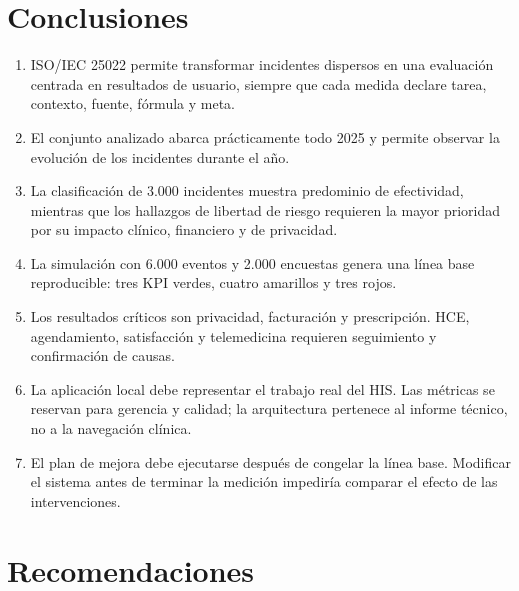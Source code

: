 \section{Conclusiones}

\begin{enumerate}
  \item ISO/IEC 25022 permite transformar incidentes dispersos en una evaluación centrada en resultados de usuario, siempre que cada medida declare tarea, contexto, fuente, fórmula y meta.
  \item El conjunto analizado abarca prácticamente todo 2025 y permite observar la evolución de los incidentes durante el año.
  \item La clasificación de 3.000 incidentes muestra predominio de efectividad, mientras que los hallazgos de libertad de riesgo requieren la mayor prioridad por su impacto clínico, financiero y de privacidad.
  \item La simulación con 6.000 eventos y 2.000 encuestas genera una línea base reproducible: tres KPI verdes, cuatro amarillos y tres rojos.
  \item Los resultados críticos son privacidad, facturación y prescripción. HCE, agendamiento, satisfacción y telemedicina requieren seguimiento y confirmación de causas.
  \item La aplicación local debe representar el trabajo real del HIS. Las métricas se reservan para gerencia y calidad; la arquitectura pertenece al informe técnico, no a la navegación clínica.
  \item El plan de mejora debe ejecutarse después de congelar la línea base. Modificar el sistema antes de terminar la medición impediría comparar el efecto de las intervenciones.
\end{enumerate}

\section{Recomendaciones}

